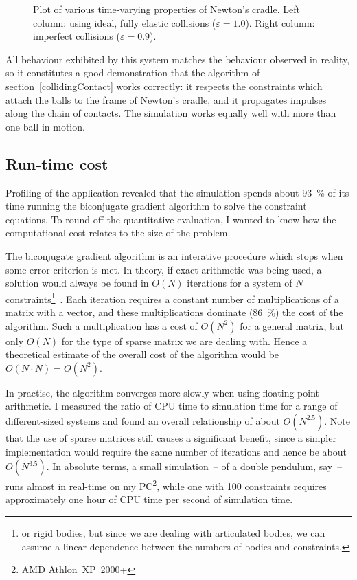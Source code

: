 \begin{figure}
\centerline{}
\caption{Plot of various time-varying properties of Newton's cradle. Left column: using ideal,
    fully elastic collisions ($\varepsilon = 1.0$). Right column: imperfect collisions
    ($\varepsilon = 0.9$).\label{cradlePlots}}
\end{figure}

All behaviour exhibited by this system matches the behaviour observed in reality, so it
constitutes a good demonstration that the algorithm of section~\ref{collidingContact}
works correctly: it respects the constraints which attach the balls to the frame of Newton's
cradle, and it propagates impulses along the chain of contacts. The simulation works equally
well with more than one ball in motion.

\subsection{Run-time cost}

Profiling of the application revealed that the simulation spends about 93~\% of its time running
the biconjugate gradient algorithm to solve the constraint equations. To round off the quantitative
evaluation, I wanted to know how the computational cost relates to the size of the problem.

The biconjugate gradient algorithm is an interative procedure which stops when some error
criterion is met. In theory, if exact arithmetic was being used, a solution would always be found
in $O(N)$ iterations for a system of $N$ constraints\footnote{or rigid bodies, but since we are
dealing with articulated bodies, we can assume a linear dependence between the numbers of bodies
and constraints.}~\cite{NRinC}. Each iteration requires a constant number of multiplications of a
matrix with a vector, and these multiplications dominate (86~\%) the cost of the algorithm. Such
a multiplication has a cost of $O(N^2)$ for a general matrix, but only
$O(N)$ for the type of sparse matrix we are dealing with. Hence a theoretical estimate of the
overall cost of the algorithm would be $O(N\cdot N) = O(N^2)$.

In practise, the algorithm converges more slowly when using floating-point arithmetic.
I measured the ratio of CPU time to simulation time for a range of different-sized systems and
found an overall relationship of about $O(N^{2.5})$. Note that the use of sparse matrices still
causes a significant benefit, since a simpler implementation would require the same number of
iterations and hence be about $O(N^{3.5})$. In absolute terms, a small simulation~-- of a
double pendulum, say~-- runs almost in real-time on my PC\footnote{AMD Athlon~XP~2000+},
while one with 100 constraints requires approximately one hour of CPU time per second of
simulation time.

